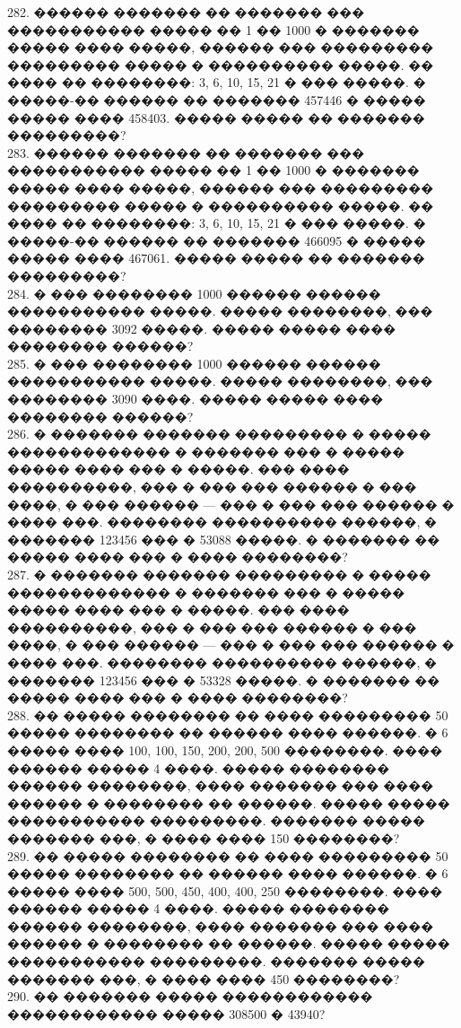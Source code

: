 \documentclass[12pt]{article}
\begin{document}
282. ������ ������� �� ������� ��� ����������� ����� �� 1 �� 1000 � ������� ����� ���� �����, ������ ��� ��������� ��������� ����� � ���������� �����. �� ���� �� ��������: 3, 6, 10, 15, 21 � ��� �����. � �����-�� ������ �� ������� 457446 � ����� ����� ���� 458403. ����� ����� �� ������� ���������?\\
283. ������ ������� �� ������� ��� ����������� ����� �� 1 �� 1000 � ������� ����� ���� �����, ������ ��� ��������� ��������� ����� � ���������� �����. �� ���� �� ��������: 3, 6, 10, 15, 21 � ��� �����. � �����-�� ������ �� ������� 466095 � ����� ����� ���� 467061. ����� ����� �� ������� ���������?\\
284. � ��� �������� 1000 ������ ������ ����������� �����. ����� ��������, ��� �������� 3092 �����. ����� ����� ���� �������� ������?\\
285. � ��� �������� 1000 ������ ������ ����������� �����. ����� ��������, ��� �������� 3090 ����. ����� ����� ���� �������� ������?\\
286. � ������� ������� ��������� � ����� ������������� � ������� ��� � ����� ����� ���� ��� � �����. ��� ���� ����������, ��� � ��� ��� ������ � ��� ����, � ��� ������ --- ��� � ��� ��� ������ � ���� ���. �������� ���������� ������, � ������� 123456 ��� � 53088 �����. � ������� �� ����� ���� ��� � ���� ��������?\\
287. � ������� ������� ��������� � ����� ������������� � ������� ��� � ����� ����� ���� ��� � �����. ��� ���� ����������, ��� � ��� ��� ������ � ��� ����, � ��� ������ --- ��� � ��� ��� ������ � ���� ���. �������� ���������� ������, � ������� 123456 ��� � 53328 �����. � ������� �� ����� ���� ��� � ���� ��������?\\
288. �� ����� �������� �� ���� ��������� 50 ����� �������� �� ������ ���� ������. � 6 ����� ���� 100, 100, 150, 200, 200, 500 ��������. ���� ������ ����� 4 ����. ����� �������� ������ ��������, ���� ������� ��� ���� ������ � �������� �� ������. ����� ����� ����������� ���������. ������� ����� ������� ���, � ���� ���� 150 ��������?\\
289. �� ����� �������� �� ���� ��������� 50 ����� �������� �� ������ ���� ������. � 6 ����� ���� 500, 500, 450, 400, 400, 250 ��������. ���� ������ ����� 4 ����. ����� �������� ������ ��������, ���� ������� ��� ���� ������ � �������� �� ������. ����� ����� ����������� ���������. ������� ����� ������� ���, � ���� ���� 450 ��������?\\
290. �� ������� ����� ������������ ������������ ����� 308500 � 43940?\\
\end{document}
